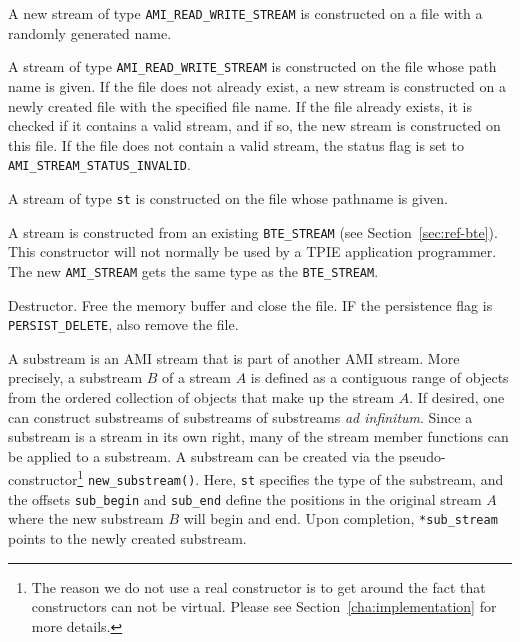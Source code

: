 
  \btabb
  
   {A new stream of type
    \lstinline|AMI_READ_WRITE_STREAM| is constructed on a file with a
    randomly generated name.}
 
   {A stream of
    type \lstinline|AMI_READ_WRITE_STREAM| is constructed on the file
    whose path name is given. If the file does not already exist, a
    new stream is constructed on a newly created file with the
    specified file name. If the file already exists, it is checked if
    it contains a valid stream, and if so, the new stream is
    constructed on this file. If the file does not contain a valid
    stream, the status flag is set to
    \lstinline|AMI_STREAM_STATUS_INVALID|.}
  
   {A stream of type \lstinline|st| is
    constructed on the file whose pathname is given.}
  
   {A stream is
    constructed from an existing \lstinline|BTE_STREAM| (see
    Section~\ref{sec:ref-bte}). This constructor will not normally be
    used by a TPIE application programmer. The new
    \lstinline|AMI_STREAM| gets the same type as the
    \lstinline|BTE_STREAM|.}

     {Destructor. Free the memory
    buffer and close the file. IF the persistence flag is
    \lstinline|PERSIST_DELETE|, also remove the file.}
  
   {A
    substream is an AMI stream that is part of another AMI stream.
    More precisely, a substream $B$ of a stream $A$ is defined as a
    contiguous range of objects from the ordered collection of objects
    that make up the stream $A$.  If desired, one can construct
    substreams of substreams of substreams {\em ad infinitum}. Since a
    substream is a stream in its own right, many of the stream member
    functions can be applied to a substream. A substream can be
    created via the pseudo-constructor\footnote{The reason we do not
      use a real constructor is to get around the fact that
      constructors can not be virtual. Please see
      Section~\ref{cha:implementation} for more details.}
    \lstinline|new_substream()|. Here, \lstinline|st| specifies the
    type of the substream, and the offsets \lstinline|sub_begin| and
    \lstinline|sub_end| define the positions in the original stream
    $A$ where the new substream $B$ will begin and end. Upon
    completion, \lstinline|*sub_stream| points to the newly created
    substream.}

